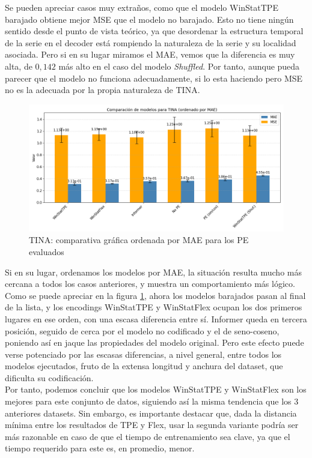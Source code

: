 Se pueden apreciar casos muy extraños, como que el modelo WinStatTPE barajado obtiene mejor MSE que el modelo no barajado. Esto no tiene ningún sentido desde el punto de vista teórico, ya que desordenar la estructura temporal de la serie en el decoder está rompiendo la naturaleza de la serie y su localidad asociada. Pero si en su lugar miramos el MAE, vemos que la diferencia es muy alta, de $0,142$ más alto en el caso del modelo \textit{Shuffled}. Por tanto, aunque pueda parecer que el modelo no funciona adecuadamente, si lo esta haciendo pero MSE no es la adecuada por la propia naturaleza de TINA.\\

\begin{figure}[!ht]
	\centering
	\includegraphics[scale=0.45]{img/tinafinal2}
	\caption{TINA: comparativa gráfica ordenada por MAE para los PE evaluados}
	\label{tinafinal2}
\end{figure}

Si en su lugar, ordenamos los modelos por MAE, la situación resulta mucho más cercana a todos los casos anteriores, y muestra un comportamiento más lógico. Como se puede apreciar en la figura \ref{tinafinal2}, ahora los modelos barajados pasan al final de la lista, y los encodings WinStatTPE y WinStatFlex ocupan los dos primeros lugares en ese orden, con una escasa diferencia entre sí. Informer queda en tercera posición, seguido de cerca por el modelo no codificado y el de seno-coseno, poniendo así en jaque las propiedades del modelo original. Pero este efecto puede verse potenciado por las escasas diferencias, a nivel general, entre todos los modelos ejecutados, fruto de la extensa longitud y anchura del dataset, que dificulta su codificación.\\

Por tanto, podemos concluir que los modelos WinStatTPE y WinStatFlex son los mejores para este conjunto de datos, siguiendo así la misma tendencia que los 3 anteriores datasets. Sin embargo, es importante destacar que, dada la distancia mínima entre los resultados de TPE y Flex, usar la segunda variante podría ser más razonable en caso de que el tiempo de entrenamiento sea clave, ya que el tiempo requerido para este es, en promedio, menor.

